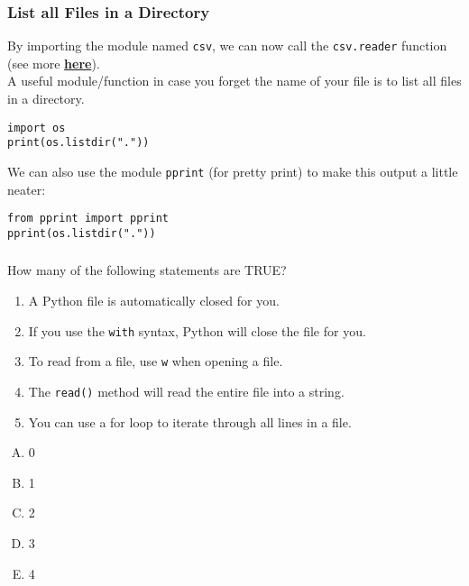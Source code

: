 \documentclass[xcolor=svgnames]{beamer}
\newcommand{\nl}{\\[1em]}
\newcommand{\ft}[1]{\frametitle{#1}}
\begin{document}
\begin{frame}[fragile]\ft{List all Files in a Directory}
By importing the module named {\tt csv}, we can now call the {\tt csv.reader} function (see more \href{https://docs.python.org/3/library/csv.html}{\bf here}).\nl

A useful module/function in case you forget the name of your file is to list all files in a directory.  
\begin{Verbatim}[xleftmargin=.5in, frame=single]
import os
print(os.listdir("."))
\end{Verbatim}
We can also use the module {\tt pprint} (for pretty print) to make this output a little neater:
\begin{Verbatim}[xleftmargin=.5in, frame=single]
from pprint import pprint
pprint(os.listdir("."))
\end{Verbatim}
\end{frame}




\begin{frame}[fragile]\ft{}
  \begin{example}
How many of the following statements are TRUE?
\begin{enumerate}
\item {{A Python file is automatically closed for you.
}}
\item {{If you use the {\tt with} syntax, Python will close the file for you.
}}
\item {{To read from a file, use {\tt w} when opening a file.
}}
\item {{The {\tt read()} method will read the entire file into a string.
}} 
\item {{You can use a for loop to iterate through all lines in a file.}} 
\end{enumerate}
\begin{multicols}{5}
\begin{enumerate}[A)]
\item 0 
\item 1
\item 2
\item 3
\item 4
\end{enumerate}
\end{multicols}
  \end{example} 
\end{frame}


\end{document}
